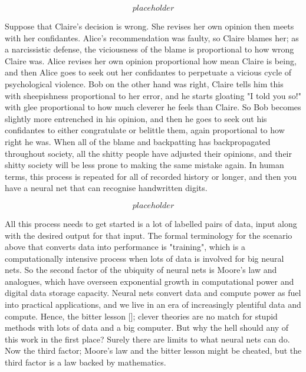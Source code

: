 \[placeholder\]

Suppose that Claire's decision is wrong. She revises her own opinion then meets with her confidantes. Alice's recommendation was faulty, so Claire blames her; as a narcissistic defense, the viciousness of the blame is proportional to how wrong Claire was. Alice revises her own opinion proportional how mean Claire is being, and then Alice goes to seek out her confidantes to perpetuate a vicious cycle of psychological violence. Bob on the other hand was right, Claire tells him this with sheepishness proportional to her error, and he starts gloating "I told you so!" with glee proportional to how much cleverer he feels than Claire. So Bob becomes slightly more entrenched in his opinion, and then he goes to seek out his confidantes to either congratulate or belittle them, again proportional to how right he was. When all of the blame and backpatting has backpropagated throughout society, all the shitty people have adjusted their opinions, and their shitty society will be less prone to making the same mistake again. In human terms, this process is repeated for all of recorded history or longer, and then you have a neural net that can recognise handwritten digits.

\[placeholder\]

All this process needs to get started is a lot of labelled pairs of data, input along with the desired output for that input. The formal terminology for the scenario above that converts data into performance is "training", which is a computationally intensive process when lots of data is involved for big neural nets. So the second factor of the ubiquity of neural nets is Moore's law and analogues, which have overseen exponential growth in computational power and digital data storage capacity. Neural nets convert data and compute power as fuel into practical applications, and we live in an era of increasingly plentiful data and compute. Hence, the bitter lesson []; clever theories are no match for stupid methods with lots of data and a big computer. But why the hell should any of this work in the first place? Surely there are limits to what neural nets can do. Now the third factor; Moore's law and the bitter lesson might be cheated, but the third factor is a law backed by mathematics.

\begin{theorem}

\end{theorem}

